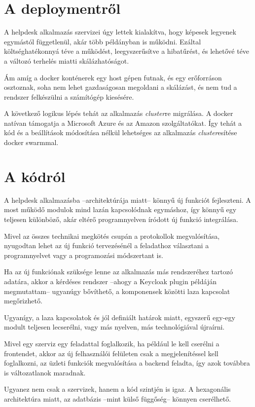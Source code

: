 \section{A deploymentről}

A helpdesk alkalmazás szervizei úgy lettek kialakítva, hogy képesek legyenek egymástól függetlenül, akár több példányban is működni. Ezáltal költséghatékonnyá téve a működést, leegyszerűsítve a hibatűrést, és lehetővé téve a változó terhelés miatti skálázhatóságot.

Ám amíg a docker konténerek egy host gépen futnak, és egy erőforráson osztoznak, soha nem lehet gazdaságosan megoldani a skálázást, és nem tud a rendszer felkészülni a számítógép kiesésére.

A következő logikus lépés tehát az alkalmazás \textit{cluster}re migrálása. A docker natívan támogatja a Microsoft Azure és az Amazon \cite{docker_website_deploy_ECS} szolgáltatókat. Így tehát a kód és a beállítások módosítása nélkül lehetséges az alkalmazás \textit{cluster}esítése docker swarmmal.

\bigskip
\section{A kódról}
A helpdesk alkalmazásba --architektúrája miatt-- könnyű új funkciót fejleszteni. A most működő modulok mind lazán kapcsolódnak egymáshoz, így könnyű egy teljesen különböző, akár eltérő programnyelven íródott új funkció integrálása.

Mivel az összes technikai megkötés csupán a protokollok megvalósítása, nyugodtan lehet az új funkció tervezésénél a feladathoz választani a programnyelvet vagy a programozási módszertant is. 

Ha az új funkciónak szüksége lenne az alkalmazás más rendszeréhez tartozó adatára, akkor a kérdéses rendszer --ahogy a Keycloak plugin példáján megmutattam-- ugyanúgy bővíthető, a komponensek közötti laza kapcsolat megőrizhető.

Ugyanígy, a laza kapcsolatok és jól definiált határok miatt, egyszerű egy-egy modult teljesen lecserélni, vagy más nyelven, más technológiával újraírni.

Mivel egy szerviz egy feladattal foglalkozik, ha például le kell cserélni a frontendet, akkor az új felhasználói felületen csak a megjelenítéssel kell foglalkozni, az üzleti funkciók megvalósítása a backend feladta, így azok továbbra is változatlanok maradnak.

Ugyanez nem csak a szervizek, hanem a kód szintjén is igaz. A hexagonális architektúra miatt, az adatbázis --mint külső függőség-- könnyen cserélhető. 




